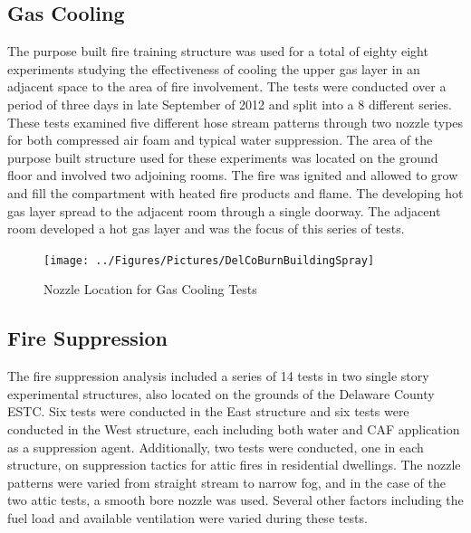 \documentclass[12pt,oneside]{book}
\begin{document}
\subsection{Gas Cooling}
\label{sec:Gas_Cooling}

The purpose built fire training structure was used for a total of eighty eight experiments studying the effectiveness of cooling the upper gas layer in an adjacent space to the area of fire involvement. The tests were conducted over a period of three days in late September of 2012 and split into a 8 different series. These tests examined five different hose stream patterns through two nozzle types for both compressed air foam and typical water suppression. The area of the purpose built structure used for these experiments was located on the ground floor and involved two adjoining rooms.  The fire was ignited and allowed to grow and fill the compartment with heated fire products and flame.  The developing hot gas layer spread to the adjacent room through a single doorway.  The adjacent room developed a hot gas layer and was the focus of this series of tests.  

\begin{figure}[!ht]
	\texttt{[image: ../Figures/Pictures/DelCoBurnBuildingSpray]}
	\caption{Nozzle Location for Gas Cooling Tests}
	\label{fig:Nozzle_Location_Gas_Cooling_Tests}
\end{figure}



\subsection{Fire Suppression}
\label{sec:Fire_Suppression}

The fire suppression analysis included a series of 14 tests in two single story experimental structures, also located on the grounds of the Delaware County ESTC. Six tests were conducted in the East structure and six tests were conducted in the West structure, each including both water and CAF application as a suppression agent. Additionally, two tests were conducted, one in each structure, on suppression tactics for attic fires in residential dwellings. The nozzle patterns were varied from straight stream to narrow fog, and in the case of the two attic tests, a smooth bore nozzle was used. Several other factors including the fuel load and available ventilation were varied during these tests.
\end{document}
